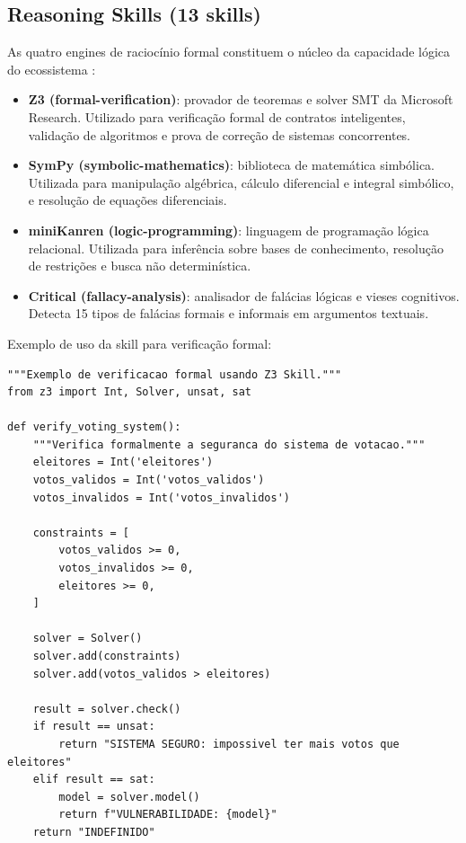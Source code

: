 \subsection{Reasoning Skills (13 skills)}
\label{subsec:reasoning-skills}

As quatro engines de raciocínio formal constituem o núcleo da capacidade
lógica do ecossistema \cite{russell2020inteligencia,
wooldridge2009multiagent}:

\begin{itemize}
\item \textbf{Z3 (formal-verification)}: provador de teoremas e solver
SMT da Microsoft Research. Utilizado para verificação formal de
contratos inteligentes, validação de algoritmos e prova de correção
de sistemas concorrentes.
\item \textbf{SymPy (symbolic-mathematics)}: biblioteca de matemática
simbólica. Utilizada para manipulação algébrica, cálculo diferencial
e integral simbólico, e resolução de equações diferenciais.
\item \textbf{miniKanren (logic-programming)}: linguagem de programação
lógica relacional. Utilizada para inferência sobre bases de
conhecimento, resolução de restrições e busca não determinística.
\item \textbf{Critical (fallacy-analysis)}: analisador de falácias
lógicas e vieses cognitivos. Detecta 15 tipos de falácias formais e
informais em argumentos textuais.
\end{itemize}

Exemplo de uso da skill  para verificação formal:

\begin{lstlisting}[style=pythonstyle, caption={Verificacao formal com Z3},
                   label={lst:z3-example}]
"""Exemplo de verificacao formal usando Z3 Skill."""
from z3 import Int, Solver, unsat, sat

def verify_voting_system():
    """Verifica formalmente a seguranca do sistema de votacao."""
    eleitores = Int('eleitores')
    votos_validos = Int('votos_validos')
    votos_invalidos = Int('votos_invalidos')

    constraints = [
        votos_validos >= 0,
        votos_invalidos >= 0,
        eleitores >= 0,
    ]

    solver = Solver()
    solver.add(constraints)
    solver.add(votos_validos > eleitores)

    result = solver.check()
    if result == unsat:
        return "SISTEMA SEGURO: impossivel ter mais votos que eleitores"
    elif result == sat:
        model = solver.model()
        return f"VULNERABILIDADE: {model}"
    return "INDEFINIDO"
\end{lstlisting}

